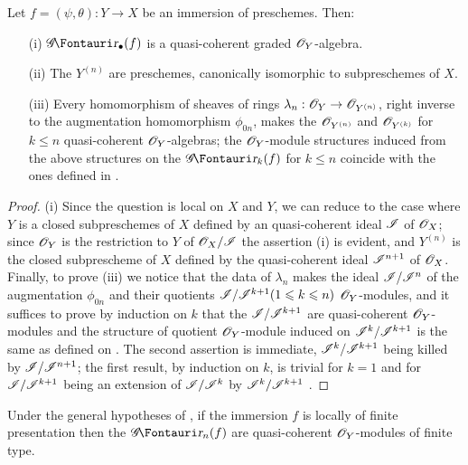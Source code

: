 \begin{proposition}[16.1.5]
\label{IV.16.1.5}
Let $f = (\psi, \theta): Y \to X$ be an immersion of preschemes.
Then:
\begin{enumerate}
  \item[{\rm(i)}] $\shGr_\bullet(f)$ is a quasi-coherent graded $\mathscr{O}_Y$-algebra.
  \item[{\rm(ii)}] The $Y^{(n)}$ are preschemes, canonically isomorphic to subpreschemes of $X$.
  \item[{\rm(iii)}] Every homomorphism of sheaves of rings $\lambda_n: \sh{O}_Y \to \sh{O}_{Y^{(n)}}$, right inverse to the augmentation homomorphism $\phi_{0n}$, makes the $\mathscr{O}_{Y^{(n)}}$ and $\mathscr{O}_{Y^{(k)}}$ for $k\leq n$ quasi-coherent $\mathscr{O}_Y$-algebras;
  the $\mathscr{O}_Y$-module structures induced from the above structures on the $\shGr_k(f)$ for $k \leq n$ coincide with the ones defined in .
\end{enumerate}
\end{proposition}

\begin{proof}
(i) Since the question is local on $X$ and $Y$, we can reduce to the case where $Y$ is a closed subpreschemes of $X$ defined by an quasi-coherent ideal $\mathscr{I}$ of $\mathscr{O}_X$;
since $\mathscr{O}_Y$ is the restriction to $Y$ of $\mathscr{O}_X/\mathscr{I}$ the assertion (i) is evident, and $Y^{(n)}$ is the closed subprescheme of $X$ defined by the quasi-coherent ideal $\mathscr{I}^{n+1}$ of $\mathscr{O}_X$.
Finally, to prove (iii) we notice that the data of $\lambda_n$ makes the ideal $\mathscr{I}/\mathscr{I}^n$ of the augmentation $\phi_{0n}$ and their quotients $\mathscr{I}/\mathscr{I}^{k+1} (1\leqslant k \leqslant n)$ $\mathscr{O}_Y$-modules, and it suffices to prove by induction on $k$ that the $\mathscr{I}/\mathscr{I}^{k+1}$ are quasi-coherent $\mathscr{O}_Y$-modules and the structure of quotient $\mathscr{O}_Y$-module induced on $\mathscr{I}^k/\mathscr{I}^{k+1}$ is the same as defined on .
The second assertion is immediate, $\mathscr{I}^k/\mathscr{I}^{k+1}$ being killed by $\mathscr{I}/\mathscr{I}^{n+1}$;
the first result, by induction on $k$, is trivial for $k=1$ and for $\mathscr{I}/\mathscr{I}^{k+1}$ being an extension of $\mathscr{I}/\mathscr{I}^{k}$ by $\mathscr{I}^k/\mathscr{I}^{k+1}$ .
\end{proof}

\begin{corollary}[16.1.6]
\label{IV.16.1.6}
Under the general hypotheses of , if the immersion $f$ is locally of finite presentation then the $\shGr_n(f)$ are quasi-coherent $\mathscr{O}_Y$-modules of finite type.
\end{corollary}

